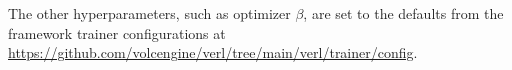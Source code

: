 



The other hyperparameters, such as optimizer $\beta$, are set to the defaults from the framework trainer configurations at \url{https://github.com/volcengine/verl/tree/main/verl/trainer/config}.
